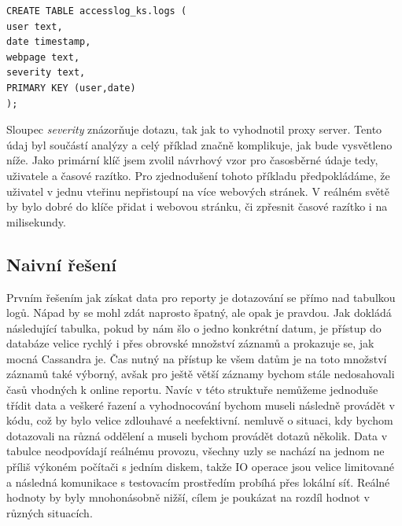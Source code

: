 \begin{lstlisting}[caption={Návrh tabulky pro ukládání všech logů},label=LogTable]
CREATE TABLE accesslog_ks.logs ( 
user text,
date timestamp,
webpage text,
severity text,
PRIMARY KEY (user,date) 
);
\end{lstlisting}

Sloupec \emph{severity} znázorňuje  dotazu, tak jak to vyhodnotil proxy server. Tento údaj byl součástí analýzy a celý příklad značně komplikuje, jak bude vysvětleno níže. Jako primární klíč jsem zvolil návrhový vzor pro časosběrné údaje tedy, uživatele a časové razítko. Pro zjednodušení tohoto příkladu předpokládáme, že uživatel v jednu vteřinu nepřistoupí na více webových stránek. V reálném světě by bylo dobré do klíče přidat i webovou stránku, či zpřesnit časové razítko i na milisekundy. 

\subsection{Naivní řešení}
Prvním řešením jak získat data pro reporty je dotazování se přímo nad tabulkou logů. Nápad by se mohl zdát naprosto špatný, ale opak je pravdou. Jak dokládá následující tabulka, pokud by nám šlo o jedno konkrétní datum, je přístup do databáze velice rychlý i přes obrovské množství záznamů a prokazuje se, jak mocná Cassandra je. Čas nutný na přístup ke všem datům je na toto množství záznamů také výborný, avšak pro ještě větší záznamy bychom stále nedosahovali časů vhodných k online reportu. Navíc v této struktuře nemůžeme jednoduše třídit data a veškeré řazení a vyhodnocování bychom museli následně provádět v kódu, což by bylo velice zdlouhavé a neefektivní. nemluvě o situaci, kdy bychom dotazovali na různá oddělení a museli bychom provádět dotazů několik. Data v tabulce neodpovídají reálnému provozu, všechny uzly se nachází na jednom ne příliš výkoném počítači s jedním diskem, takže IO operace jsou velice limitované a následná komunikace s testovacím prostředím probíhá přes lokální síť. Reálné hodnoty by byly mnohonásobně nižší, cílem je poukázat na rozdíl hodnot v různých situacích.   	


